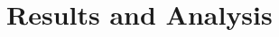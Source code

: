 \documentclass[aspectratio=169]{beamer}
\begin{document}
\section{Results and Analysis}

        
    
    

\end{document}
